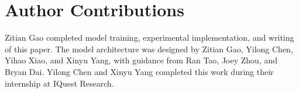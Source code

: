 \newpage
\section*{Author Contributions}
\label{sec:contrib}

Zitian Gao completed model training, experimental implementation, and writing of this paper. The model architecture was designed by Zitian Gao, Yilong Chen, Yihao Xiao, and Xinyu Yang, with guidance from Ran Tao, Joey Zhou, and Bryan Dai. Yilong Chen and Xinyu Yang completed this work during their internship at IQuest Research.